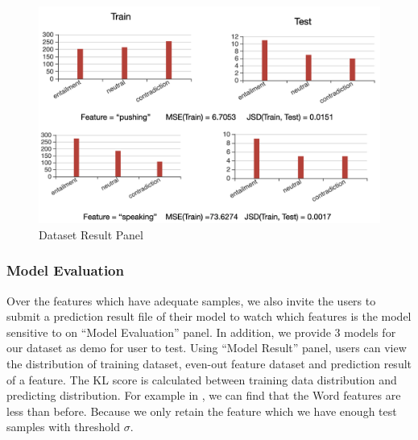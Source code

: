 \begin{figure}[th]
\centering
\includegraphics[width=1.0\columnwidth]{picture/dataset_result.jpg}
\caption{Dataset Result Panel}
\label{fig:dataset_result}
\end{figure}

\subsubsection{Model Evaluation}

Over the features which have adequate samples, we also invite the users to 
submit a prediction result file of their model to watch which features is the 
model sensitive to on ``Model Evaluation'' panel. 
In addition, we provide 3 models for our dataset as demo for user 
to test.  Using  ``Model Result'' panel, users can view the distribution of training dataset, 
even-out feature dataset and prediction result of a feature. The KL score is 
calculated between training data distribution and predicting distribution. For example in 
, we can find that the Word features are less than before. 
Because we only retain the feature which we have enough test samples with threshold 
$\sigma$.

